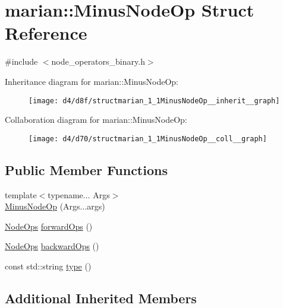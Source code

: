 \hypertarget{structmarian_1_1MinusNodeOp}{}\section{marian\+:\+:Minus\+Node\+Op Struct Reference}
\label{structmarian_1_1MinusNodeOp}


{\ttfamily \#include $<$node\+\_\+operators\+\_\+binary.\+h$>$}



Inheritance diagram for marian\+:\+:Minus\+Node\+Op\+:
\nopagebreak
\begin{figure}[H]
\begin{center}
\leavevmode
\texttt{[image: d4/d8f/structmarian\_1\_1MinusNodeOp\_\_inherit\_\_graph]}
\end{center}
\end{figure}


Collaboration diagram for marian\+:\+:Minus\+Node\+Op\+:
\nopagebreak
\begin{figure}[H]
\begin{center}
\leavevmode
\texttt{[image: d4/d70/structmarian\_1\_1MinusNodeOp\_\_coll\_\_graph]}
\end{center}
\end{figure}
\subsection*{Public Member Functions}
\begin{DoxyCompactItemize}
\item 
{\footnotesize template$<$typename... Args$>$ }\\\hyperlink{structmarian_1_1MinusNodeOp_ab1c64071a6a5bd68de315b0c5d544303}{Minus\+Node\+Op} (Args...\+args)
\item 
\hyperlink{namespacemarian_a4956376218cc236016c20bc4071470da}{Node\+Ops} \hyperlink{structmarian_1_1MinusNodeOp_aea7d65faca82ef791bb618a6b7de5467}{forward\+Ops} ()
\item 
\hyperlink{namespacemarian_a4956376218cc236016c20bc4071470da}{Node\+Ops} \hyperlink{structmarian_1_1MinusNodeOp_a126094d4dcd7a89fc897f0017d18e51b}{backward\+Ops} ()
\item 
const std\+::string \hyperlink{structmarian_1_1MinusNodeOp_af53ee5f8b9c44ee3e09ecac0c1714899}{type} ()
\end{DoxyCompactItemize}
\subsection*{Additional Inherited Members}



